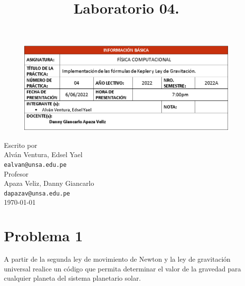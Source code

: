 \documentclass[a4paper,12pt]{article}
\begin{document}
\lstset{language=Python,frame=single, firstnumber=1,basicstyle=\footnotesize,numbers=left,showspaces=false,showstringspaces=false}    
    \begin{figure}
        \centering
        \includegraphics[scale=0.7]{table04word}
    \end{figure}    
    
    \title{Laboratorio 04.}
    \date{\vspace{-5ex}}
    \maketitle
    \begin{center}
        Escrito por\\
        Alván Ventura, Edsel Yael\\ \texttt{ealvan@unsa.edu.pe}
        \\[3mm]
        Profesor\\Apaza Veliz, Danny Giancarlo\\ \texttt{dapazav@unsa.edu.pe}\\[3mm]
        \today
    \end{center}
    \section{Problema 1}
        A partir de la segunda ley de movimiento de Newton 
        y la ley de gravitación universal realice un código
        que permita determinar el valor de la gravedad para 
        cualquier planeta del sistema planetario solar.
\end{document}

